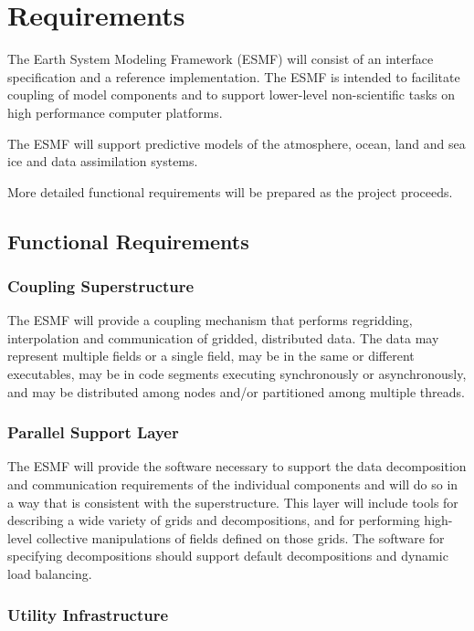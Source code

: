 \section{Requirements}

The Earth System Modeling Framework (ESMF) will consist of an interface
specification and a reference implementation.  The ESMF is intended to 
facilitate coupling of model components and to support lower-level
non-scientific tasks on high performance computer platforms.

The ESMF will support predictive models of the atmosphere, ocean, land and
sea ice and data assimilation systems.

More detailed functional requirements will be prepared as the project 
proceeds.

\subsection{Functional Requirements}

\subsubsection{Coupling Superstructure}

The ESMF will provide a coupling mechanism that performs regridding,
interpolation and communication of gridded, distributed data.  The 
data may represent multiple fields or a single field, may be in the
same or different executables, may be in code segments executing 
synchronously or asynchronously, and may be distributed among nodes
and/or partitioned among multiple threads.

\subsubsection{Parallel Support Layer}

The ESMF will provide the software necessary to support the data
decomposition and communication requirements of the individual components
and will do so in a way that is consistent with the superstructure.
This layer will include
tools for describing a wide variety of grids and decompositions,
and for performing high-level collective manipulations of fields defined
on those grids.  The software for specifying decompositions should support
default decompositions and dynamic load balancing.

\subsubsection{Utility Infrastructure}


